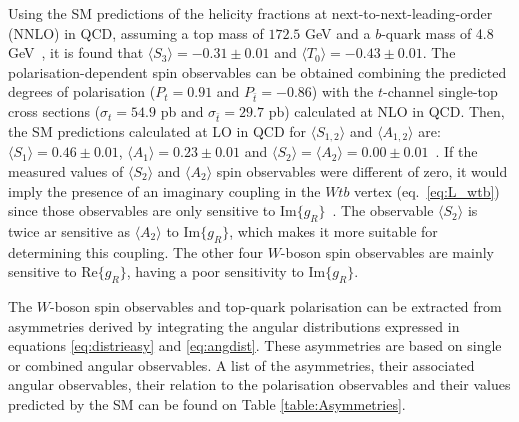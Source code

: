 Using the SM predictions of the helicity fractions at next-to-next-leading-order (NNLO) in QCD, assuming a top mass of $172.5$ GeV and a $b$-quark mass of 4.8 GeV~\cite{Czarnecki:2010gb}, it is found that $\langle S_{3} \rangle = -0.31 \pm 0.01$ and $\langle T_{0} \rangle = -0.43 \pm 0.01$. The polarisation-dependent spin observables can be obtained combining the predicted degrees of polarisation ($P_t= 0.91$ and $P_{\bar{t}}=-0.86$) with the $t$-channel single-top cross sections ($\sigma_t = 54.9$ pb and $\sigma_{\bar{t}}=29.7$ pb) calculated at NLO in QCD. Then, the SM predictions calculated at LO in QCD for $\langle S_{1, 2} \rangle$ and $\langle A_{1, 2} \rangle$ are: $\langle S_{1} \rangle=0.46\pm 0.01$, $\langle A_{1} \rangle = 0.23\pm 0.01$ and $\langle S_{2} \rangle = \langle A_{2} \rangle = 0.00\pm 0.01$~\cite{Probing}. If the measured values of $\langle S_{2} \rangle$ and $\langle A_{2} \rangle$ spin observables were different of zero, it would imply the presence of an imaginary coupling in the $Wtb$ vertex (eq.~\eqref{eq:L_wtb}) since those observables are only sensitive to Im$\{ g_R \}$~\cite{Probing}. The observable $\langle S_{2} \rangle$ is twice ar sensitive as $\langle A_{2} \rangle$ to Im$\{ g_R \}$, which makes it more suitable for determining this coupling. The other four $W$-boson spin observables are mainly sensitive to Re$\{ g_R \}$, having a poor sensitivity to Im$\{ g_R \}$. %


The $W$-boson spin observables and top-quark polarisation can be extracted from asymmetries derived by integrating the angular distributions expressed in equations \eqref{eq:distrieasy} and \eqref{eq:angdist}. These asymmetries are based on single or combined angular observables. A list of the asymmetries, their associated angular observables, their relation to the polarisation observables and their values predicted by the SM can be found on Table \ref{table:Asymmetries}.

